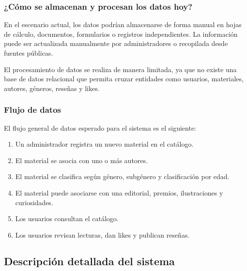 \documentclass[12pt,a4paper]{article}
\begin{document}
\subsubsection{¿Cómo se almacenan y procesan los datos hoy?}

En el escenario actual, los datos podrían almacenarse de forma manual en hojas de cálculo, documentos, formularios o registros independientes. La información puede ser actualizada manualmente por administradores o recopilada desde fuentes públicas.

El procesamiento de datos se realiza de manera limitada, ya que no existe una base de datos relacional que permita cruzar entidades como usuarios, materiales, autores, géneros, reseñas y likes.

\subsubsection{Flujo de datos}

El flujo general de datos esperado para el sistema es el siguiente:

\begin{enumerate}
    \item Un administrador registra un nuevo material en el catálogo.
    \item El material se asocia con uno o más autores.
    \item El material se clasifica según género, subgénero y clasificación por edad.
    \item El material puede asociarse con una editorial, premios, ilustraciones y curiosidades.
    \item Los usuarios consultan el catálogo.
    \item Los usuarios revisan lecturas, dan likes y publican reseñas.
\end{enumerate}

\subsection{Descripción detallada del sistema}

\end{document}
